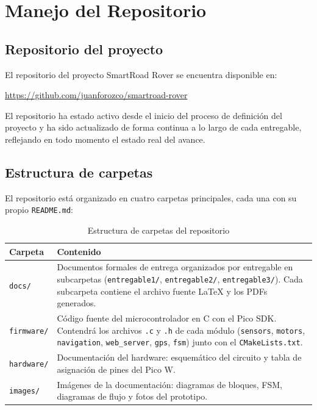 \documentclass[12pt]{report}
\begin{document}
\chapter{Manejo del Repositorio}
 
\section{Repositorio del proyecto}
 
El repositorio del proyecto SmartRoad Rover se encuentra disponible en:
 
\begin{center}
\url{https://github.com/juanforozco/smartroad-rover}
\end{center}
 
El repositorio ha estado activo desde el inicio del proceso de definición del proyecto y ha sido actualizado de forma continua a lo largo de cada entregable, reflejando en todo momento el estado real del avance.
 
\section{Estructura de carpetas}
 
El repositorio está organizado en cuatro carpetas principales, cada una con su propio \texttt{README.md}:
 
\begin{table}[H]
\centering
\renewcommand{\arraystretch}{1.4}
\begin{tabular}{|l|p{9cm}|}
\hline
\textbf{Carpeta} & \textbf{Contenido} \\
\hline
\texttt{docs/} & Documentos formales de entrega organizados por entregable en subcarpetas (\texttt{entregable1/}, \texttt{entregable2/}, \texttt{entregable3/}). Cada subcarpeta contiene el archivo fuente LaTeX y los PDFs generados. \\
\hline
\texttt{firmware/} & Código fuente del microcontrolador en C con el Pico SDK. Contendrá los archivos \texttt{.c} y \texttt{.h} de cada módulo (\texttt{sensors}, \texttt{motors}, \texttt{navigation}, \texttt{web\_server}, \texttt{gps}, \texttt{fsm}) junto con el \texttt{CMakeLists.txt}. \\
\hline
\texttt{hardware/} & Documentación del hardware: esquemático del circuito y tabla de asignación de pines del Pico W. \\
\hline
\texttt{images/} & Imágenes de la documentación: diagramas de bloques, FSM, diagramas de flujo y fotos del prototipo. \\
\hline
\end{tabular}
\caption{Estructura de carpetas del repositorio}
\end{table}
 
\end{document}
